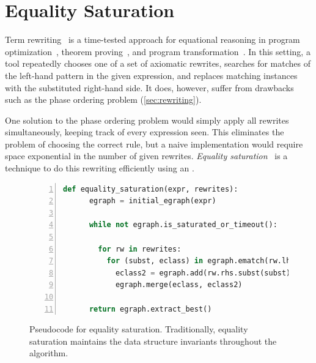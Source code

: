 \section{Equality Saturation}
\label{sec:eqsat}

Term rewriting~\cite{nachum-rewrites} is a time-tested approach
  for equational reasoning in
  program optimization~\cite{eqsat, denali},
  theorem proving~\cite{simplify, z3},
  and program transformation~\cite{graphs}.
In this setting, a tool repeatedly chooses one of a set of axiomatic rewrites,
  searches for matches of the left-hand pattern in the given
  expression, and replaces matching instances with the substituted
  right-hand side.
It does, however, suffer from drawbacks such as the phase ordering
 problem (\autoref{sec:rewriting}).


One solution to the phase ordering problem would simply apply all
  rewrites simultaneously, keeping track of every expression seen.
This eliminates the problem of choosing the correct rule, but
  a naive implementation would require space exponential in the number
  of given rewrites.
\textit{Equality saturation}~\cite{eqsat, eqsat-llvm} is a technique to do this
  rewriting efficiently using an \egraph.

\begin{figure}
  \centering
  \begin{lstlisting}[language=Python, gobble=4, numbers=left, basicstyle=\small\ttfamily, xleftmargin=40mm]
    def equality_saturation(expr, rewrites):
      egraph = initial_egraph(expr)

      while not egraph.is_saturated_or_timeout():

        for rw in rewrites:
          for (subst, eclass) in egraph.ematch(rw.lhs):
            eclass2 = egraph.add(rw.rhs.subst(subst))
            egraph.merge(eclass, eclass2)

      return egraph.extract_best()
  \end{lstlisting}
  \caption{
    Pseudocode for equality saturation.
    Traditionally, equality saturation maintains the \egraph data structure
      invariants throughout the algorithm.
  }
  \label{fig:eq-sat-bg}
\end{figure}

